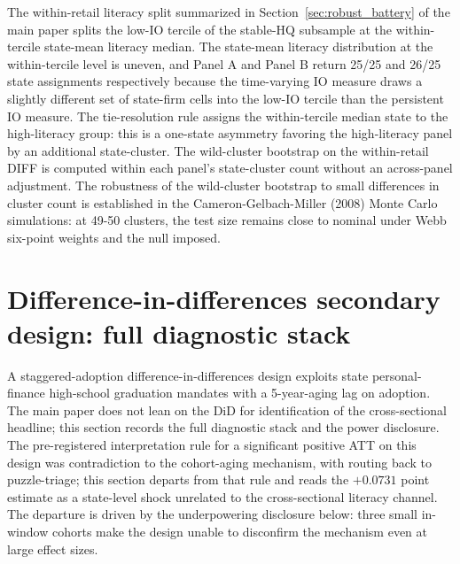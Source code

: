 \documentclass[12pt]{article}
\begin{document}
The within-retail literacy split summarized in Section~\ref{sec:robust_battery} of the main paper splits the low-IO tercile of the stable-HQ subsample at the within-tercile state-mean literacy median. The state-mean literacy distribution at the within-tercile level is uneven, and Panel A and Panel B return 25/25 and 26/25 state assignments respectively because the time-varying IO measure draws a slightly different set of state-firm cells into the low-IO tercile than the persistent IO measure. The tie-resolution rule assigns the within-tercile median state to the high-literacy group: this is a one-state asymmetry favoring the high-literacy panel by an additional state-cluster. The wild-cluster bootstrap on the within-retail DIFF is computed within each panel's state-cluster count without an across-panel adjustment. The robustness of the wild-cluster bootstrap to small differences in cluster count is established in the Cameron-Gelbach-Miller (2008) Monte Carlo simulations: at 49-50 clusters, the test size remains close to nominal under Webb six-point weights and the null imposed.

\section{Difference-in-differences secondary design: full diagnostic stack}
\label{ia:did}

A staggered-adoption difference-in-differences design exploits state personal-finance high-school graduation mandates with a 5-year-aging lag on adoption. The main paper does not lean on the DiD for identification of the cross-sectional headline; this section records the full diagnostic stack and the power disclosure. The pre-registered interpretation rule for a significant positive ATT on this design was contradiction to the cohort-aging mechanism, with routing back to puzzle-triage; this section departs from that rule and reads the $+0.0731$ point estimate as a state-level shock unrelated to the cross-sectional literacy channel. The departure is driven by the underpowering disclosure below: three small in-window cohorts make the design unable to disconfirm the mechanism even at large effect sizes.
\end{document}
